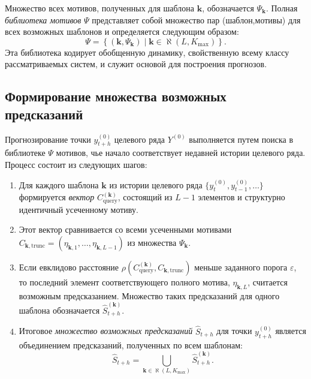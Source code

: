 Множество всех мотивов, полученных для шаблона $\boldsymbol{k}$,
обозначается $\Psi_{\boldsymbol{k}}$. Полная \textit{библиотека мотивов}
 $\Psi$ представляет собой множество пар (шаблон,мотивы) для всех возможных
  шаблонов и определяется следующим образом:
\[
\Psi = \left\{ (\boldsymbol{k}, \Psi_{\boldsymbol{k}}) \mid \boldsymbol{k}
\in \aleph(L, K_{\max}) \right\}.
\]
Эта библиотека кодирует обобщенную динамику, свойственную всему классу рассматриваемых
 систем, и служит основой для построения прогнозов.

\subsection{Формирование множества возможных предсказаний}

Прогнозирование точки $y_{t+h}^{(0)}$ целевого ряда $Y^{(0)}$
 выполняется путем поиска в библиотеке $\Psi$ мотивов, чье начало
  соответствует недавней истории целевого ряда. Процесс состоит из следующих шагов:
\begin{enumerate}
    \item Для каждого шаблона $\boldsymbol{k}$ из истории целевого
     ряда $\{y_{t}^{(0)}, y_{t-1}^{(0)}, \dots\}$ формируется \textit{вектор}
      $C_{\text{query}}^{(\boldsymbol{k})}$, состоящий из $L-1$ элементов
       и структурно идентичный усеченному мотиву.

    \item Этот вектор сравнивается со всеми усеченными мотивами $C_{\boldsymbol{k},
     \text{trunc}} = (\eta_{\boldsymbol{k},1}, \dots, \eta_{\boldsymbol{k}, L-1})$
     из множества $\Psi_{\boldsymbol{k}}$.

    \item Если евклидово расстояние $\rho(C_{\text{query}}^{(\boldsymbol{k})},
     C_{\boldsymbol{k}, \text{trunc}})$ меньше заданного порога $\varepsilon$,
      то последний элемент соответствующего полного мотива, $\eta_{\boldsymbol{k},L}$,
       считается возможным предсказанием. Множество таких предсказаний для одного шаблона
       обозначается $\hat{S}_{t+h}^{(\boldsymbol{k})}$.

    \item Итоговое \textit{множество возможных предсказаний} $\hat{S}_{t+h}$ для
     точки $y_{t+h}^{(0)}$ является объединением предсказаний, полученных по всем шаблонам:
    \[
    \hat{S}_{t+h} = \bigcup_{\boldsymbol{k} \in \aleph(L, K_{\max})} \hat{S}_{t+h}^{(\boldsymbol{k})}.
    \]
\end{enumerate}


